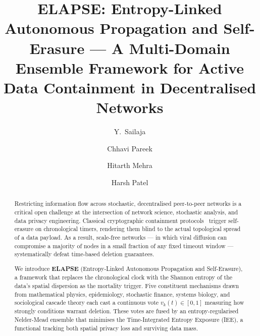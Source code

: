 \documentclass[review,12pt]{elsarticle}
\begin{document}
\begin{frontmatter}

\title{ELAPSE: Entropy-Linked Autonomous Propagation and Self-Erasure ---
       A Multi-Domain Ensemble Framework for Active Data Containment
       in Decentralised Networks}

\author[rv]{Y.~Sailaja}

\author[rv]{Chhavi Pareek}
\author[rv]{Hitarth Mehra}
\author[rv]{Harsh Patel}

\address[rv]{Department of Mathematics / Department of Computer Science \&
             Engineering, RV College of Engineering, Bangalore 560059, India}

\begin{abstract}
Restricting information flow across stochastic, decentralised peer-to-peer
networks is a critical open challenge at the intersection of network science,
stochastic analysis, and data privacy engineering. Classical cryptographic
containment protocols~\cite{geambasu2009vanish,tang2010fade} trigger
self-erasure on chronological timers, rendering them blind to the actual
topological spread of a data payload. As a result, scale-free networks ---
in which viral diffusion can compromise a majority of nodes in a small
fraction of any fixed timeout window --- systematically defeat
time-based deletion guarantees.

We introduce \textbf{ELAPSE} (Entropy-Linked Autonomous Propagation and
Self-Erasure), a framework that replaces the chronological clock with the
Shannon entropy of the data's spatial dispersion as the mortality trigger.
Five constituent mechanisms drawn from mathematical physics, epidemiology,
stochastic finance, systems biology, and sociological cascade theory each
cast a continuous vote $v_k(t) \in [0,1]$ measuring how strongly conditions
warrant deletion. These votes are fused by an entropy-regularised Nelder-Mead
ensemble that minimises the Time-Integrated Entropy Exposure (IEE), a
functional tracking both spatial privacy loss and surviving data mass.


\end{abstract}
\end{frontmatter}
\end{document}
